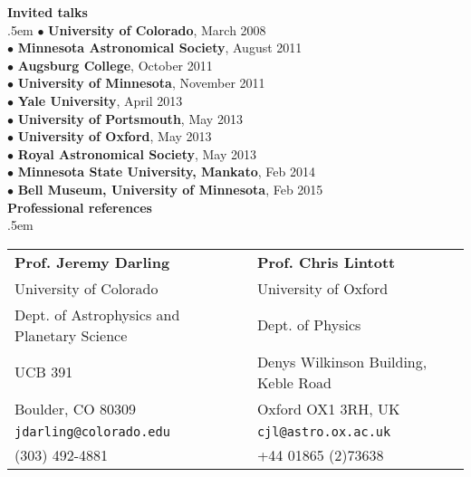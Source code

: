 {{{\medskip
\noindent
{\Large\bf Invited talks}\\[4pt]
\medskip
\parindent .5em
$\bullet$ {\bf University of Colorado}, March 2008 \\[2pt]
$\bullet$ {\bf Minnesota Astronomical Society}, August 2011 \\[2pt]
$\bullet$ {\bf Augsburg College}, October 2011 \\[2pt]
$\bullet$ {\bf University of Minnesota}, November 2011 \\[2pt]
$\bullet$ {\bf Yale University}, April 2013 \\[2pt]
$\bullet$ {\bf University of Portsmouth}, May 2013 \\[2pt]
$\bullet$ {\bf University of Oxford}, May 2013 \\[2pt]
$\bullet$ {\bf Royal Astronomical Society}, May 2013 \\[2pt]
$\bullet$ {\bf Minnesota State University, Mankato}, Feb 2014 \\[2pt]
$\bullet$ {\bf Bell Museum, University of Minnesota}, Feb 2015 \\[2pt]

\parindent0in
\medskip
\medskip
\noindent
{\Large\bf Professional references}\\[4pt]
\medskip
\parindent .5em

\begin{tabular}{@{}p{3.5in}p{3.5in}}
{\large \bf Prof. Jeremy Darling}             &     {\large \bf Prof. Chris Lintott}        \\	       
University of Colorado                        &     University of Oxford                  \\      
Dept. of Astrophysics and Planetary Science   &     Dept. of Physics  	                  \\   
UCB 391		                                  &	    Denys Wilkinson Building, Keble Road  \\ 
Boulder, CO  80309                            &     Oxford OX1 3RH, UK                    \\
{\tt jdarling@colorado.edu}                   &     {\tt cjl@astro.ox.ac.uk}              \\
(303) 492-4881                                &     +44 01865 (2)73638                    \\[8pt]


\end{tabular}}}}
